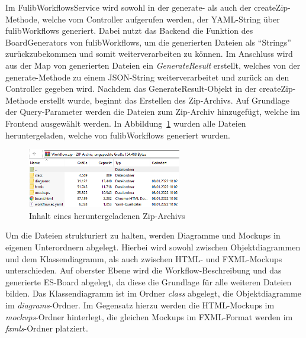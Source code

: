 Im FulibWorkflowsService wird sowohl in der generate- als auch der createZip-Methode, welche vom Controller aufgerufen werden,
der YAML-String über fulibWorkflows generiert.
Dabei nutzt das Backend die Funktion des BoardGenerators von fulibWorkflows, um die generierten Dateien als ``Strings'' zurückzubekommen und somit weiterverarbeiten zu können.
Im Anschluss wird aus der Map von generierten Dateien ein \textit{GenerateResult} erstellt, welches von der generate-Methode zu einem JSON-String weiterverarbeitet und zurück an den Controller gegeben wird.
Nachdem das GenerateResult-Objekt in der createZip-Methode erstellt wurde, beginnt das Erstellen des Zip-Archivs.
Auf Grundlage der Query-Parameter werden die Dateien zum Zip-Archiv hinzugefügt, welche im Frontend ausgewählt werden.
In Abbildung~\ref{fig:export} wurden alle Dateien heruntergeladen, welche von fulibWorkflows generiert wurden.

\begin{figure}[h]
    \centering
    \includegraphics[width=0.6\textwidth]{images/3.3/export}
    \caption{Inhalt eines heruntergeladenen Zip-Archivs}
    \label{fig:export}
\end{figure}

Um die Dateien strukturiert zu halten, werden Diagramme und Mockups in eigenen Unterordnern abgelegt.
Hierbei wird sowohl zwischen Objektdiagrammen und dem Klassendiagramm, als auch zwischen HTML- und FXML-Mockups unterschieden.
Auf oberster Ebene wird die Workflow-Beschreibung und das generierte \ac{ES}-Board abgelegt, da diese
die Grundlage für alle weiteren Dateien bilden.
Das Klassendiagramm ist im Ordner \textit{class} abgelegt, die Objektdiagramme im \textit{diagrams}-Ordner.
Im Gegensatz hierzu werden die HTML-Mockups im \textit{mockups}-Ordner hinterlegt, die gleichen Mockups im FXML-Format werden
im \textit{fxmls}-Ordner platziert.
